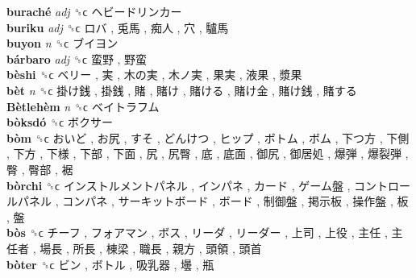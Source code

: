 \textbf{buraché} \emph{adj}  ␝ϲ   ヘビードリンカー   \\
\textbf{buriku} \emph{adj}  ␝ϲ   ロバ ,  兎馬 ,  痴人 ,  穴 ,  驢馬   \\
\textbf{buyon} \emph{n}  ␝ϲ   ブイヨン   \\
\textbf{bárbaro} \emph{adj}  ␝ϲ   蛮野 ,  野蛮   \\
\textbf{bèshi} ␝ϲ   ベリー ,  実 ,  木の実 ,  木ノ実 ,  果実 ,  液果 ,  漿果   \\
\textbf{bèt} \emph{n}  ␝ϲ   掛け銭 ,  掛銭 ,  賭 ,  賭け ,  賭ける ,  賭け金 ,  賭け銭 ,  賭する   \\
\textbf{Bètlehèm} \emph{n}  ␝ϲ   ベイトラフム   \\
\textbf{bòksdó} ␝ϲ   ボクサー   \\
\textbf{bòm} ␝ϲ   おいど ,  お尻 ,  すそ ,  どんけつ ,  ヒップ ,  ボトム ,  ボム ,  下つ方 ,  下側 ,  下方 ,  下様 ,  下部 ,  下面 ,  尻 ,  尻臀 ,  底 ,  底面 ,  御尻 ,  御居処 ,  爆弾 ,  爆裂弾 ,  臀 ,  臀部 ,  裾   \\
\textbf{bòrchi} ␝ϲ   インストルメントパネル ,  インパネ ,  カード ,  ゲーム盤 ,  コントロールパネル ,  コンパネ ,  サーキットボード ,  ボード ,  制御盤 ,  掲示板 ,  操作盤 ,  板 ,  盤   \\
\textbf{bòs} ␝ϲ   チーフ ,  フォアマン ,  ボス ,  リーダ ,  リーダー ,  上司 ,  上役 ,  主任 ,  主任者 ,  場長 ,  所長 ,  棟梁 ,  職長 ,  親方 ,  頭領 ,  頭首   \\
\textbf{bòter} ␝ϲ   ビン ,  ボトル ,  吸乳器 ,  壜 ,  瓶   \\
